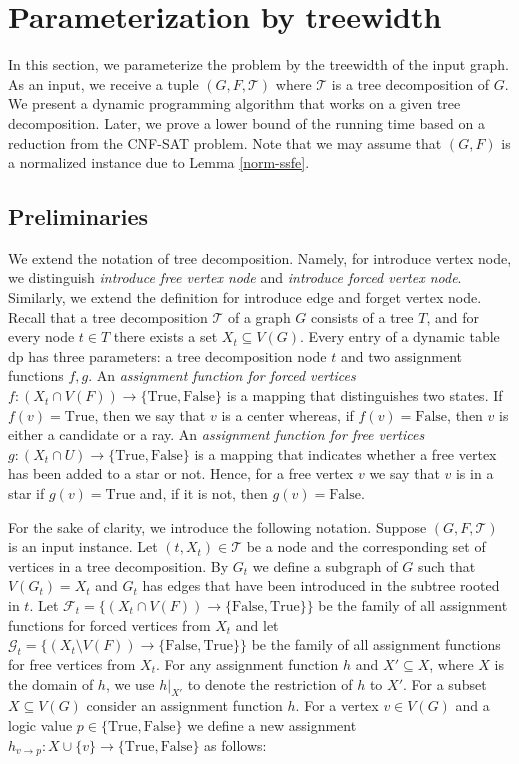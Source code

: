 \documentclass[en]{pracamgr}
\theoremstyle{definition}
\newcommand{\cnfsat}{{\sc CNF-SAT}}
\newcommand{\true}{\textrm{True}}
\newcommand{\false}{\textrm{False}}
\begin{document}
\section{Parameterization by treewidth}

In this section, we parameterize the problem by the treewidth of the input graph. As an input, we receive a tuple $(G,F,\mathcal{T})$ where $\mathcal{T}$ is a tree decomposition of $G$. We present a dynamic programming algorithm that works on a given tree decomposition. Later, we prove a lower bound of the running time based on a reduction from the \cnfsat{} problem. Note that we may assume that $(G,F)$ is a normalized instance due to Lemma \ref{norm-ssfe}.

\subsection{Preliminaries}

We extend the notation of tree decomposition. Namely, for introduce vertex node, we distinguish \textit{introduce free vertex node} and \textit{introduce forced vertex node}. Similarly, we extend the definition for introduce edge and forget vertex node. Recall that a tree decomposition $\mathcal{T}$ of a graph $G$ consists of a tree $T$, and for every node $t \in T$ there exists a set $X_t \subseteq V(G)$. Every entry of a dynamic table $\text{dp}$ has three parameters: a tree decomposition node $t$ and two assignment functions $f,g$. An \textit{assignment function for forced vertices} $f: (X_t \cap V(F)) \rightarrow \{\true, \false\}$ is a mapping that distinguishes two states. If $f(v)=\true$, then we say that $v$ is a center whereas, if $f(v)=\false$, then $v$ is either a candidate or a ray. An \textit{assignment function for free vertices} $g: (X_t \cap U) \rightarrow \{\true, \false\}$ is a mapping that indicates whether a free vertex has been added to a star or not. Hence, for a free vertex $v$ we say that $v$ is in a star if $g(v)=\true$ and, if it is not, then $g(v)=\false$.

For the sake of clarity, we introduce the following notation. Suppose $(G,F,\mathcal{T})$ is an input instance. Let $(t,X_t) \in \mathcal{T}$ be a node and the corresponding set of vertices in a tree decomposition. By $G_t$ we define a subgraph of $G$ such that $V(G_t) = X_t$ and $G_t$ has edges that have been introduced in the subtree rooted in $t$. Let $\mathcal{F}_t = \{(X_t \cap V(F)) \rightarrow \{\false,\true\}\}$ be the family of all assignment functions for forced vertices from $X_t$ and let $\mathcal{G}_t = \{(X_t \setminus V(F)) \rightarrow \{\false,\true\}\}$ be the family of all assignment functions for free vertices from $X_t$. For any assignment function $h$ and $X' \subseteq X$, where $X$ is the domain of $h$, we use $h|_{X'}$ to denote the restriction of $h$ to $X'$. For a subset $X \subseteq V(G)$ consider an assignment function $h$. For a vertex $v \in V(G)$ and a logic value $p \in \{\true, \false\}$ we define a new assignment $h_{v \rightarrow p}: X \cup \{v\} \rightarrow \{\true, \false\}$ as follows:
\end{document}
